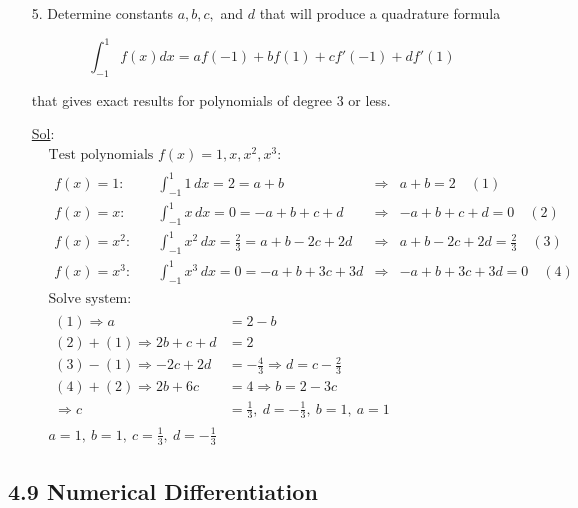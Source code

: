 \begin{enumerate}
  \item[5.] Determine constants \(a, b, c, \) and \(d\) that will
    produce a quadrature formula

    \[
      \int_{-1}^{1} f(x)dx = af(-1) + bf(1) + cf'(-1) + df'(1)
    \]

    that gives exact results for polynomials of degree 3 or less.

    \underline{Sol}:\\

    \[
      \begin{aligned}
        & \text{Test polynomials } f(x) = 1, x, x^2, x^3: \\
        &
        \begin{aligned}
          f(x) = 1:&\quad \int_{-1}^1 1\,dx = 2 = a + b &\Rightarrow&
          a + b = 2 \quad (1) \\
          f(x) = x:&\quad \int_{-1}^1 x\,dx = 0 = -a + b + c + d
          &\Rightarrow& -a + b + c + d = 0 \quad (2) \\
          f(x) = x^2:&\quad \int_{-1}^1 x^2\,dx = \tfrac{2}{3} = a +
          b - 2c + 2d &\Rightarrow& a + b - 2c + 2d = \tfrac{2}{3} \quad (3) \\
          f(x) = x^3:&\quad \int_{-1}^1 x^3\,dx = 0 = -a + b + 3c +
          3d &\Rightarrow& -a + b + 3c + 3d = 0 \quad (4)
        \end{aligned} \\
        & \text{Solve system:} \\
        &
        \begin{aligned}
          (1)\Rightarrow a &= 2 - b \\
          (2)+(1)\Rightarrow 2b + c + d &= 2 \\
          (3)-(1)\Rightarrow -2c + 2d &= -\tfrac{4}{3} \Rightarrow d
          = c - \tfrac{2}{3} \\
          (4)+(2)\Rightarrow 2b + 6c &= 4 \Rightarrow b = 2 - 3c \\
          \Rightarrow c &= \tfrac{1}{3},\ d = -\tfrac{1}{3},\ b = 1,\ a = 1
        \end{aligned} \\
        & \boxed{a = 1,\ b = 1,\ c = \tfrac{1}{3},\ d = -\tfrac{1}{3}}
      \end{aligned}
    \]

\end{enumerate}

\subsection*{4.9 Numerical Differentiation}

